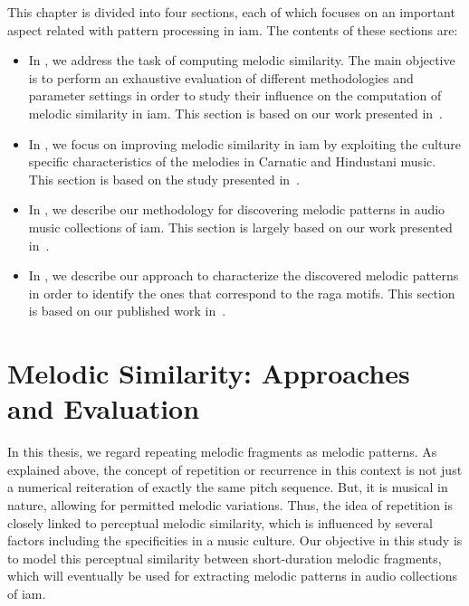 This chapter is divided into four sections, each of which focuses on an important aspect related with pattern processing in \gls{iam}. The contents of these sections are:
\begin{itemize}
	\item In , we address the task of computing melodic similarity. The main objective is to perform an exhaustive evaluation of different methodologies and parameter settings in order to study their influence on the computation of melodic similarity in \gls{iam}. This section is based on our work presented in~\cite{gulati_ICASSP2015}.
	\item In , we focus on improving melodic similarity in \gls{iam} by exploiting the culture specific characteristics of the melodies in Carnatic and Hindustani music. This section is based on the study presented in~\cite{gulati_ISMIR_2015}.
	\item In , we describe our methodology for discovering melodic patterns in audio music collections of \gls{iam}. This section is largely based on our work presented in~\cite{gulati_SITIS_2014}.
	\item In , we describe our approach to characterize the discovered melodic patterns in order to identify the ones that correspond to the \gls{raga} motifs. This section is based on our published work in~\cite{gulati_communities_2016}.
\end{itemize}




\section{Melodic Similarity: Approaches and Evaluation}
\label{sec:patterns_evaluation_of_similarity_measures}

In this thesis, we regard repeating melodic fragments as melodic patterns. As explained above, the concept of repetition or recurrence in this context is not just a numerical reiteration of exactly the same pitch sequence. But, it is musical in nature, allowing for permitted melodic variations. Thus, the idea of repetition is closely linked to perceptual melodic similarity, which is influenced by several factors including the specificities in a music culture. Our objective in this study is to model this perceptual similarity between short-duration melodic fragments, which will eventually be used for extracting melodic patterns in audio collections of \gls{iam}.

